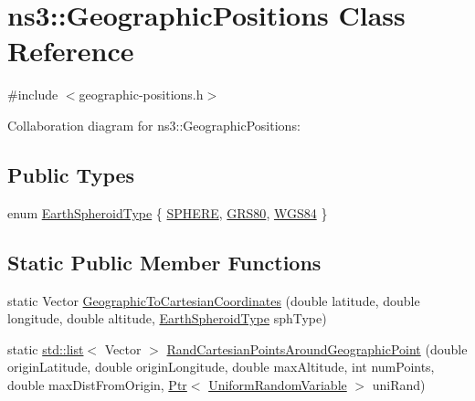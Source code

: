 \hypertarget{classns3_1_1GeographicPositions}{}\section{ns3\+:\+:Geographic\+Positions Class Reference}
\label{classns3_1_1GeographicPositions}


{\ttfamily \#include $<$geographic-\/positions.\+h$>$}



Collaboration diagram for ns3\+:\+:Geographic\+Positions\+:
\subsection*{Public Types}
\begin{DoxyCompactItemize}
\item 
enum \hyperlink{classns3_1_1GeographicPositions_a434138b76563c284972bc08a9c4a6882}{Earth\+Spheroid\+Type} \{ \hyperlink{classns3_1_1GeographicPositions_a434138b76563c284972bc08a9c4a6882a96850ee7fd8e61d1b68344cc4a4949f6}{S\+P\+H\+E\+RE}, 
\hyperlink{classns3_1_1GeographicPositions_a434138b76563c284972bc08a9c4a6882a474a5b39a855a2472921a1677beabea2}{G\+R\+S80}, 
\hyperlink{classns3_1_1GeographicPositions_a434138b76563c284972bc08a9c4a6882a28c9d3d143697d5d464dcf4c96cfd5ef}{W\+G\+S84}
 \}
\end{DoxyCompactItemize}
\subsection*{Static Public Member Functions}
\begin{DoxyCompactItemize}
\item 
static Vector \hyperlink{classns3_1_1GeographicPositions_aabb0202391e635fbd7c934d345b0da31}{Geographic\+To\+Cartesian\+Coordinates} (double latitude, double longitude, double altitude, \hyperlink{classns3_1_1GeographicPositions_a434138b76563c284972bc08a9c4a6882}{Earth\+Spheroid\+Type} sph\+Type)
\item 
static \hyperlink{openflow-interface_8h_afd9bcfa176617760671b67580f536fa7}{std\+::list}$<$ Vector $>$ \hyperlink{classns3_1_1GeographicPositions_a020b37badd7a5ccf4d32854754b261c0}{Rand\+Cartesian\+Points\+Around\+Geographic\+Point} (double origin\+Latitude, double origin\+Longitude, double max\+Altitude, int num\+Points, double max\+Dist\+From\+Origin, \hyperlink{classns3_1_1Ptr}{Ptr}$<$ \hyperlink{classns3_1_1UniformRandomVariable}{Uniform\+Random\+Variable} $>$ uni\+Rand)
\end{DoxyCompactItemize}


